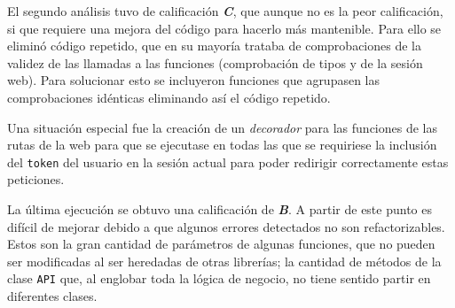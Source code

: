 El segundo análisis tuvo de calificación \textit{\textbf{C}}, que aunque no es la peor calificación, si que requiere una mejora del código para hacerlo más mantenible. Para ello se eliminó código repetido, que en su mayoría trataba de comprobaciones de la validez de las llamadas a las funciones (comprobación de tipos y de la sesión web). Para solucionar esto se incluyeron funciones que agrupasen las comprobaciones idénticas eliminando así el código repetido.

Una situación especial fue la creación de un \textit{decorador} para las funciones de las rutas de la web para que se ejecutase en todas las que se requiriese la inclusión del \texttt{token} del usuario en la sesión actual para poder redirigir correctamente estas peticiones. 

La última ejecución se obtuvo una calificación de \textit{\textbf{B}}. A partir de este punto es difícil de mejorar debido a que algunos errores detectados no son refactorizables. Estos son la gran cantidad de parámetros de algunas funciones, que no pueden ser modificadas al ser heredadas de otras librerías; la cantidad de métodos de la clase \texttt{API} que, al englobar toda la lógica de negocio, no tiene sentido partir en diferentes clases. 
